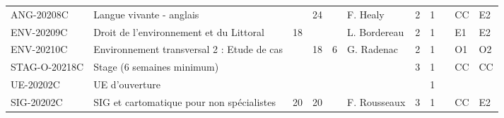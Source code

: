 \documentclass[a4paper,11pt]{article}
\begin{document}
{{\begin{tabular}{lllllllllll}
ANG-20208C                     & Langue vivante - anglais                                                                  &                           & 24                        &                           & F. Healy                           & 2                           & 1                           &                                    & CC                               & E2                               \\
ENV-20209C                     & Droit de l'environnement et du Littoral                                                   & 18                        &                           &                           & L. Bordereau                       & 2                           & 1                           &                                    & E1                               & E2                               \\
ENV-20210C                     & Environnement transversal 2 : Etude de cas                                                &                           & 18                        & 6                         & G. Radenac                         & 2                           & 1                           &                                    & O1                               & O2                               \\
STAG-O-20218C                  & Stage (6 semaines minimum)                                                                &                           &                           &                           &                                    & 3                           & 1                           &                                    & CC                               & CC                               \\
\rowcolor[HTML]{C0C0C0} 
UE-20202C                      & UE d'ouverture                                                                            &                           &                           &                           &                                    &                             & 1                           &                                    &                                  &                                  \\
SIG-20202C                     & SIG et cartomatique pour non spécialistes                                                 & 20                        & 20                        &                           & F. Rousseaux                       & 3                           & 1                           &                                    & CC                               & E2                               \\

\end{tabular}}}
\end{document}
